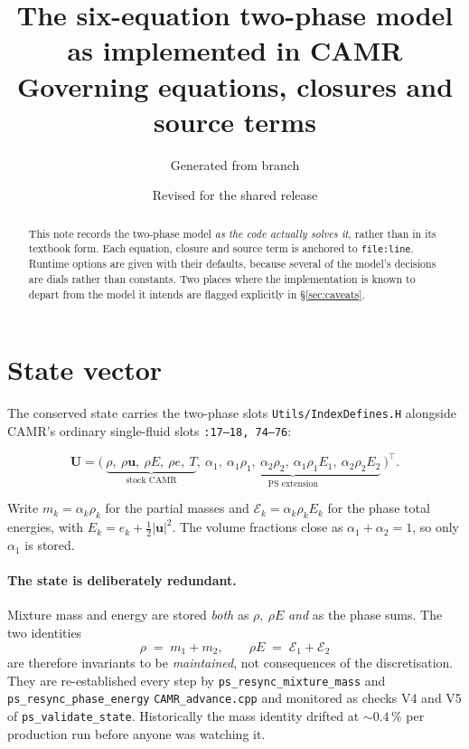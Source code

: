\documentclass[11pt,a4paper]{article}
\title{The six-equation two-phase model as implemented in CAMR\\
       \large Governing equations, closures and source terms}
\author{Generated from \code{CAMR} branch \code{co2-eos}}
\date{Revised for the shared release}
\newcommand{\uvec}{\mathbf{u}}
\newcommand{\code}[1]{\texttt{\small #1}}
\newcommand{\src}[1]{{\color{gray}\code{#1}}}
\begin{document}
\maketitle

\begin{abstract}
\noindent
This note records the two-phase model \emph{as the code actually solves it},
rather than in its textbook form.  Each equation, closure and source term is
anchored to \code{file:line}.  Runtime options are given with their defaults,
because several of the model's decisions are dials rather than constants.  Two
places where the implementation is known to depart from the model it intends
are flagged explicitly in \S\ref{sec:caveats}.
\end{abstract}

\section{State vector}

The conserved state carries the two-phase slots
\src{Utils/IndexDefines.H} alongside CAMR's ordinary single-fluid
slots \src{:17--18,~74--76}:

\begin{equation}
  \mathbf{U} =
  \bigl(\
    \underbrace{\rho,\ \rho\uvec,\ \rho E,\ \rho e,\ T}_{\text{stock CAMR}},\
    \underbrace{\alpha_1,\ \alpha_1\rho_1,\ \alpha_2\rho_2,\
                \alpha_1\rho_1E_1,\ \alpha_2\rho_2E_2}_{\text{PS extension}}\
  \bigr)^{\!\top}.
\end{equation}

Write $m_k=\alpha_k\rho_k$ for the partial masses and
$\mathcal{E}_k=\alpha_k\rho_kE_k$ for the phase total energies, with
$E_k=e_k+\tfrac12|\uvec|^2$.  The volume fractions close as
$\alpha_1+\alpha_2=1$, so only $\alpha_1$ is stored.

\paragraph{The state is deliberately redundant.}
Mixture mass and energy are stored \emph{both} as $\rho,\ \rho E$ \emph{and}
as the phase sums.  The two identities
\begin{equation}
  \rho \;=\; m_1+m_2,
  \qquad
  \rho E \;=\; \mathcal{E}_1+\mathcal{E}_2
  \label{eq:identities}
\end{equation}
are therefore invariants to be \emph{maintained}, not consequences of the
discretisation.  They are re-established every step by
\code{ps\_resync\_mixture\_mass} and \code{ps\_resync\_phase\_energy}
\src{CAMR\_advance.cpp} and monitored as checks V4 and V5 of
\code{ps\_validate\_state}.  Historically the mass identity drifted at
$\sim\!0.4\,\%$ per production run before anyone was watching it.
\end{document}
